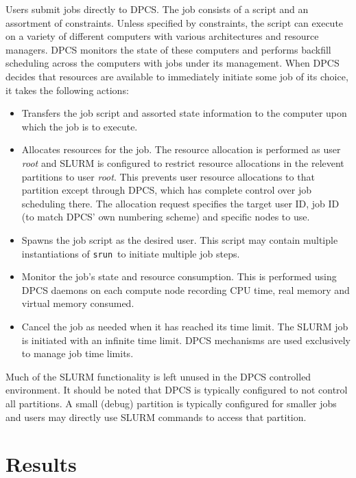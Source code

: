 \documentclass{article}
\newcommand{\srun}{{\tt srun}}
\begin{document}
Users submit jobs directly to DPCS.
The job consists of a script and an assortment of constraints. 
Unless specified by constraints, the script can execute on 
a variety of different computers with various architectures 
and resource managers. 
DPCS monitors the state of these computers and performs backfill 
scheduling across the computers with jobs under its management. 
When DPCS decides that resources are available to immediately 
initiate some job of its choice, it takes the following 
actions:
\begin{itemize}
\item Transfers the job script and assorted state information to 
the computer upon which the job is to execute.

\item Allocates resources for the job. 
The resource allocation is performed as user {\em root} and SLURM 
is configured to restrict resource allocations in the relevent 
partitions to user {\em root}.
This prevents user resource allocations to that partition
except through DPCS, which has complete control over job 
scheduling there.
The allocation request specifies the target user ID, job ID 
(to match DPCS' own numbering scheme) and specific nodes to use.

\item Spawns the job script as the desired user.
This script may contain multiple instantiations of \srun\ 
to initiate multiple job steps. 

\item Monitor the job's state and resource consumption. 
This is performed using DPCS daemons on each compute node 
recording CPU time, real memory and virtual memory consumed. 

\item Cancel the job as needed when it has reached its time limit. 
The SLURM job is initiated with an infinite time limit. 
DPCS mechanisms are used exclusively to manage job time limits. 

\end{itemize}

Much of the SLURM functionality is left unused in the DPCS 
controlled environment. 
It should be noted that DPCS is typically configured to not 
control all partitions. 
A small (debug) partition is typically configured for smaller 
jobs and users may directly use SLURM commands to access that 
partition.

\section{Results}
\end{document}
